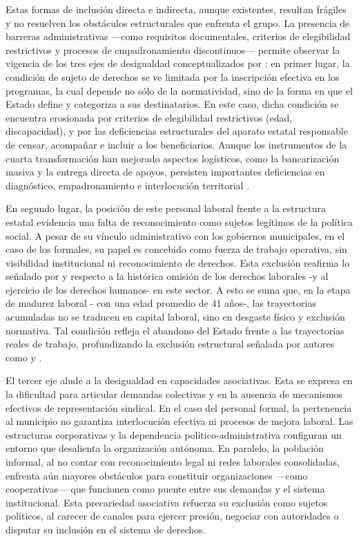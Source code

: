 \documentclass[
  spanish,
  11pt,
  a4paper,
]{scrbook}
\begin{document}
Estas formas de inclusión directa e indirecta, aunque existentes,
resultan frágiles y no resuelven los obstáculos estructurales que
enfrenta el grupo. La presencia de barreras administrativas ---como
requisitos documentales, criterios de elegibilidad restrictivos y
procesos de empadronamiento discontinuos--- permite observar la vigencia
de los tres ejes de desigualdad conceptualizados por
\textcite{Adelantado1998}: en primer lugar, la condición de sujeto de
derechos se ve limitada por la inscripción efectiva en los programas, la
cual depende no sólo de la normatividad, sino de la forma en que el
Estado define y categoriza a sus destinatarios. En este caso, dicha
condición se encuentra erosionada por criterios de elegibilidad
restrictivos (edad, discapacidad), y por las deficiencias estructurales
del aparato estatal responsable de censar, acompañar e incluir a los
beneficiarios. Aunque los instrumentos de la cuarta transformación han
mejorado aspectos logísticos, como la bancarización masiva y la entrega
directa de apoyos, persisten importantes deficiencias en diagnóstico,
empadronamiento e interlocución territorial
\autocite{Cejudo2025,CONEVAL2021}.

En segundo lugar, la posición de este personal laboral frente a la
estructura estatal evidencia una falta de reconocimiento como sujetos
legítimos de la política social. A pesar de su vínculo administrativo
con los gobiernos municipales, en el caso de los formales, su papel es
concebido como fuerza de trabajo operativa, sin visibilidad
institucional ni reconocimiento de derechos. Esta exclusión reafirma lo
señalado por \textcite{Valente2019} y \textcite{Espinosa2013} respecto a
la histórica omisión de los derechos laborales -y al ejercicio de los
derechos humanos- en este sector. A esto se suma que, en la etapa de
madurez laboral - con una edad promedio de 41 años-, las trayectorias
acumuladas no se traducen en capital laboral, sino en desgaste físico y
exclusión normativa. Tal condición refleja el abandono del Estado frente
a las trayectorias reales de trabajo, profundizando la exclusión
estructural señalada por autores como \textcite{Standing2013} y
\textcite{Antunes2005}.

El tercer eje alude a la desigualdad en capacidades asociativas. Esta se
expresa en la dificultad para articular demandas colectivas y en la
ausencia de mecanismos efectivos de representación sindical. En el caso
del personal formal, la pertenencia al municipio no garantiza
interlocución efectiva ni procesos de mejora laboral. Las estructuras
corporativas y la dependencia político-administrativa configuran un
entorno que desalienta la organización autónoma. En paralelo, la
población informal, al no contar con reconocimiento legal ni redes
laborales consolidadas, enfrenta aún mayores obstáculos para constituir
organizaciones ---como cooperativas--- que funcionen como puente entre
sus demandas y el sistema institucional. Esta precariedad asociativa
refuerza su exclusión como sujetos políticos, al carecer de canales para
ejercer presión, negociar con autoridades o disputar su inclusión en el
sistema de derechos.
\end{document}
